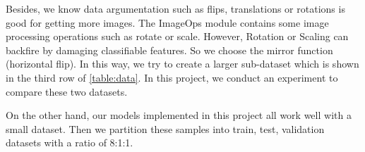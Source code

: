 Besides, we know data argumentation such as flips, translations or rotations is good for getting more images. The ImageOps module contains some image processing operations such as rotate or scale. However, Rotation or Scaling can backfire by damaging classifiable features. So we choose the mirror function (horizontal flip). In this way, we try to create a larger sub-dataset which is shown in the third row of \ref{table:data}. In this project, we conduct an experiment to compare these two datasets.

On the other hand, our models implemented in this project all work well with a small dataset. Then we partition these samples into train, test, validation datasets with a ratio of 8:1:1. 

